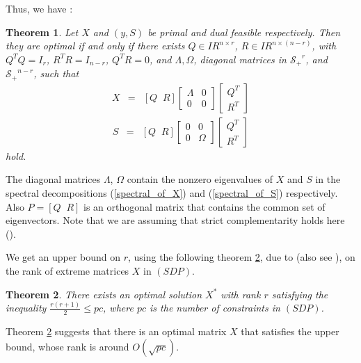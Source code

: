 \documentclass[12pt]{kluwer}
\newtheorem{theorem}{Theorem}
\newcommand{\real}{I\!\! R}
\begin{document}
\begin{article}
Thus, we have \cite{ali_hab_overton}:
\begin{theorem}
Let $X$ and $(y,S)$ be primal and dual feasible respectively. Then they are optimal if and only if
there exists $Q \in \real^{n \times r}$,
$R \in \real^{n \times (n-r)}$, with $Q^TQ = I_r$, $R^TR = I_{n-r}$, $Q^TR = 0$,
and $\Lambda, \Omega $, diagonal matrices in $\mathcal{S_+}^r$, and $\mathcal{S_+}^{n-r}$, such that
\begin{equation}
\label{spectral_of_X}
\begin{array}{ccc}
X & = & [Q \;\; R] \left[ \begin{array}{cc} \Lambda & 0 \\ 0 & 0 \end{array} \right]
\left[ \begin{array}{c} Q^T \\ R^T \end{array} \right]
\end{array}
\end{equation}
\begin{equation}
\label{spectral_of_S}
\begin{array}{ccc}
S & = & [Q \;\; R] \left[ \begin{array}{cc} 0 & 0 \\ 0 & \Omega \end{array} \right]
\left[ \begin{array}{c} Q^T \\ R^T \end{array} \right]
\end{array}
\end{equation}
hold.
\end{theorem}
The diagonal matrices $\Lambda$, $\Omega$ contain the nonzero eigenvalues of $X$ and $S$ in the
spectral decompositions (\ref{spectral_of_X}) and (\ref{spectral_of_S}) respectively.
Also $P = [Q \;\; R]$ is an orthogonal matrix that contains the common set of eigenvectors.
Note that we are assuming that strict complementarity holds here (\cite{ali_hab_overton}).

We get an upper bound on $r$, using the following theorem \ref{pataki_lemma}, due to 
(also see ), on the rank of extreme matrices $X$ in $(SDP)$.
\begin{theorem}
\label{pataki_lemma}
There exists an optimal solution $X^{*}$ with rank $r$ satisfying the inequality $\frac{r(r+1)}{2} \le pc$,
where $pc$ is the number of constraints in $(SDP)$.
\end{theorem}
Theorem \ref{pataki_lemma} suggests that there is an optimal matrix $X$ that satisfies the upper
bound, whose rank is around $O(\sqrt{pc})$.


\end{article}
\end{document}
